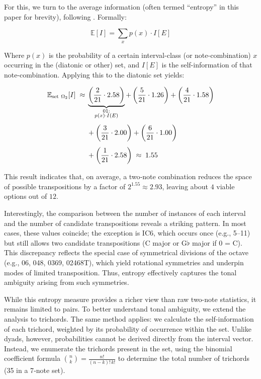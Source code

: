 \documentclass[10pt,twocolumn]{article}
\numberwithin{equation}{section} %
\begin{document}
    For this, we turn to the average information (often termed “entropy” in this paper for brevity), following \citet{shannon1948}.
    Formally:

    \begin{equation}
        \mathbb{E}[I] = \sum_{x} p(x) \cdot I[E]
        \label{eq:expected-info}
    \end{equation}

    Where $p(x)$ is the probability of a certain interval-class (or note-combination) $x$ occurring in the (diatonic or other) set, and $I[E]$ is the self-information of that note-combination.
    Applying this to the diatonic set yields:

    \begin{align}
        \mathbb{E}_{\text{set}~\Omega_{2}}[I] \;\approx\; &
        \underbrace{\left( \frac{2}{21} \cdot 2.58 \right)}_{\substack{\text{01:}\\ p(x)\cdot I(E)}} +
        \left( \frac{5}{21} \cdot 1.26 \right) +
        \left( \frac{4}{21} \cdot 1.58 \right)
        \notag \\[4pt]
        &+ \left( \frac{3}{21} \cdot 2.00 \right) +
        \left( \frac{6}{21} \cdot 1.00 \right)
        \notag \\[4pt]
        &+ \left( \frac{1}{21} \cdot 2.58 \right)
        \;\approx\; 1.55
        \label{eq:expectation-example}
    \end{align}

    This result indicates that, on average, a two‑note combination reduces the space of possible transpositions by a factor of $2^{1.55} \approx 2.93$, leaving about $4$ viable options out of $12$.

    Interestingly, the comparison between the number of instances of each interval and the number of candidate transpositions reveals a striking pattern.
    In most cases, these values coincide; the exception is IC6, which occurs once (e.g., 5–11) but still allows two candidate transpositions (C major or G$\flat$ major if 0 = C).
    This discrepancy reflects the special case of symmetrical divisions of the octave (e.g., 06, 048, 0369, 02468T), which yield rotational symmetries and underpin modes of limited transposition.
    Thus, entropy effectively captures the tonal ambiguity arising from such symmetries.

    While this entropy measure provides a richer view than raw two-note statistics, it remains limited to pairs.
    To better understand tonal ambiguity, we extend the analysis to trichords.
    The same method applies: we calculate the self-information of each trichord, weighted by its probability of occurrence within the set.
    Unlike dyads, however, probabilities cannot be derived directly from the interval vector.
    Instead, we enumerate the trichords present in the set, using the binomial coefficient formula $\binom{n}{k} = \frac{n!}{(n-k)! \, k!}$ to determine the total number of trichords (35 in a 7‑note set).
\end{document}
